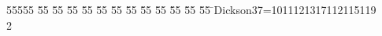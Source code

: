 %
%
\begin{tabbing}
55555 \= 55 \= 55 \= 55 \= 55 \= 55 \= 55 \= 55 \= 55 \= 55 \= 55 \= 55 \= 55 \= \>Dickson37=1011121317112115119\\[0pt]
2\>\end{tabbing}
